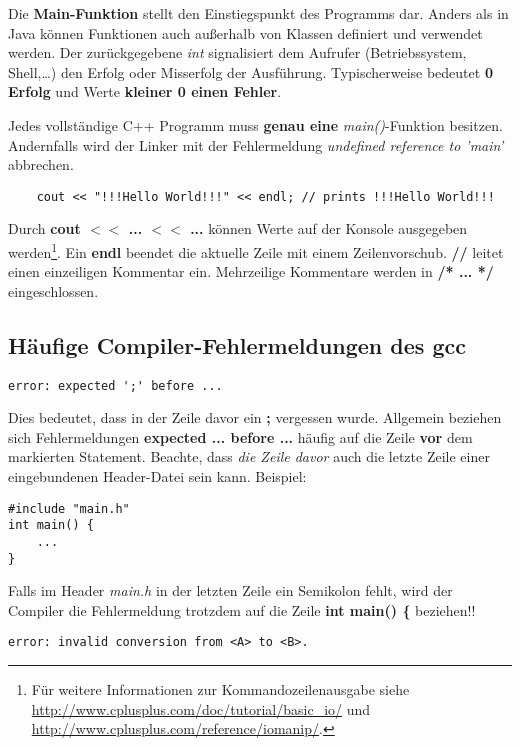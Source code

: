 Die \textbf{Main-Funktion} stellt den Einstiegspunkt des Programms dar.
Anders als in Java können Funktionen auch außerhalb von Klassen definiert und verwendet werden.
Der zurückgegebene \emph{int} signalisiert dem Aufrufer (Betriebssystem, Shell,\dots) den Erfolg oder Misserfolg der Ausführung.
Typischerweise bedeutet \textbf{0 Erfolg} und Werte \textbf{kleiner 0 einen Fehler}.

Jedes vollständige C++ Programm muss \textbf{genau eine }\emph{main()}-Funktion besitzen. Andernfalls wird der Linker mit der Fehlermeldung \emph{undefined reference to 'main'} abbrechen.

\begin{lstlisting}
	cout << "!!!Hello World!!!" << endl; // prints !!!Hello World!!!
\end{lstlisting}
Durch \textbf{cout $<<$ ... $<<$ ...} können Werte auf der Konsole ausgegeben werden\footnote{
Für weitere Informationen zur Kommandozeilenausgabe siehe \url{http://www.cplusplus.com/doc/tutorial/basic_io/} und \url{http://www.cplusplus.com/reference/iomanip/}.
}.
Ein \textbf{endl} beendet die aktuelle Zeile mit einem Zeilenvorschub.
\textbf{//} leitet einen einzeiligen Kommentar ein.
Mehrzeilige Kommentare werden in \textbf{/* ... */} eingeschlossen.

\subsection{Häufige Compiler-Fehlermeldungen des gcc}

\begin{verbatim}
error: expected ';' before ...
\end{verbatim}

Dies bedeutet, dass in der Zeile davor ein \textbf{;} vergessen wurde.
Allgemein beziehen sich Fehlermeldungen \textbf{expected ... before ...} häufig auf die Zeile \textbf{vor} dem markierten Statement.
Beachte, dass \emph{die Zeile davor} auch die letzte Zeile einer eingebundenen Header-Datei sein kann. Beispiel:

\begin{lstlisting}
#include "main.h"
int main() {
	...
}
\end{lstlisting}

Falls im Header \emph{main.h} in der letzten Zeile ein Semikolon fehlt, wird der Compiler die Fehlermeldung trotzdem auf die Zeile \textbf{int main() \{} beziehen!!

\begin{verbatim}
error: invalid conversion from <A> to <B>.
\end{verbatim}

